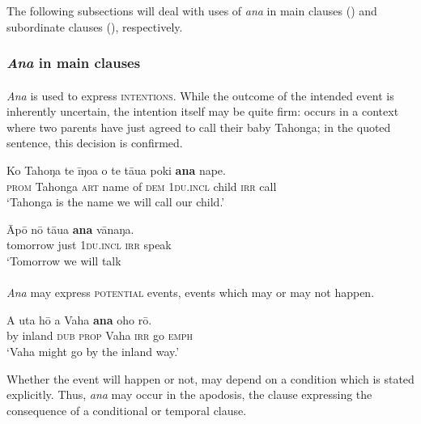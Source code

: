 The following subsections will deal with uses of \textit{ana} in main clauses () and subordinate clauses (), respectively.

\subsubsection{\textit{Ana} in main clauses}\label{sec:11.5.2.1}

\paragraph{} \textit{Ana} is used to express \textsc{intentions}. While the outcome of the intended event is inherently uncertain, the intention itself may be quite firm:  occurs in a context where two parents have just agreed to call their baby Tahonga; in the quoted sentence, this decision is confirmed.

\ea\label{ex:11.165}
\gll Ko Tahoŋa te {\ꞌ}īŋoa o te tāua poki \textbf{ana} nape. \\
\textsc{prom} Tahonga \textsc{art} name of \textsc{dem} \textsc{1du.incl} child \textsc{irr} call \\

\glt 
‘Tahonga is the name we will call our child.’ \textstyleExampleref{[R301.146]} 
\z

\ea\label{ex:11.166}
\gll Āpō nō tāua \textbf{ana} vānaŋa. \\
tomorrow just \textsc{1du.incl} \textsc{irr} speak \\

\glt 
‘Tomorrow we will talk 
\z

\paragraph{} \textit{Ana} may express \textsc{potential} events, events which may or may not happen.

\ea\label{ex:11.167}
\gll A {\ꞌ}uta hō a Vaha \textbf{ana} oho rō. \\
by inland \textsc{dub} \textsc{prop} Vaha \textsc{irr} go \textsc{emph} \\

\glt
‘Vaha might go by the inland way.’ \textstyleExampleref{[Mtx-3-01.142]}
\z

Whether the event will happen or not, may depend on a condition which is stated explicitly. Thus, \textit{ana} may occur in the apodosis, the clause expressing the consequence of a conditional or temporal clause. 

